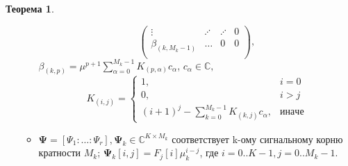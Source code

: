\documentclass[specialist, substylefile = spbureport.rtx, subf,href,colorlinks=true, 12pt]{disser}
\theoremstyle{definition}
\newtheorem{theorem}{Теорема}
\begin{document}
\begin{theorem}
\begin{enumerate}
\begin{itemize}
\begin{equation*}
\begin{pmatrix}
                    \vdots & \iddots & \iddots & 0 \\
                    \beta _{(k, M_k - 1)} & \ldots & 0 & 0 \\
                    \end{pmatrix},
            \end{equation*}
            $\beta_{(k, p)} = \mu^{p + 1} \sum_{\alpha = 0}^{M_k - 1}K_{(p, \alpha)}c_{\alpha}$, $c_{\alpha} \in \mathbb{C},$
            \begin{equation*}
                K_{(i, j)} = \begin{cases}
                1, & i = 0 \\
                0, & i > j \\
                (i + 1)^j - \sum_{k = 0}^{M_k - 1}K_{(k, j)}c_{\alpha}, & иначе
                \end{cases}
            \end{equation*}

            \item $\mathbf{\Psi} = [\Psi_1: \ldots :\Psi_r], \mathbf{\Psi}_k \in \mathbb{C}^{K \times M_k}$ соответствует k-ому сигнальному корню кратности $M_k$; $\mathbf{\Psi}_k[i, j] = F_j[i]\mu_k^{i - j}$, где $i = 0..K-1, j = 0..M_k-1$.
        \end{itemize}
    \end{enumerate}

\end{theorem}
\end{document}
